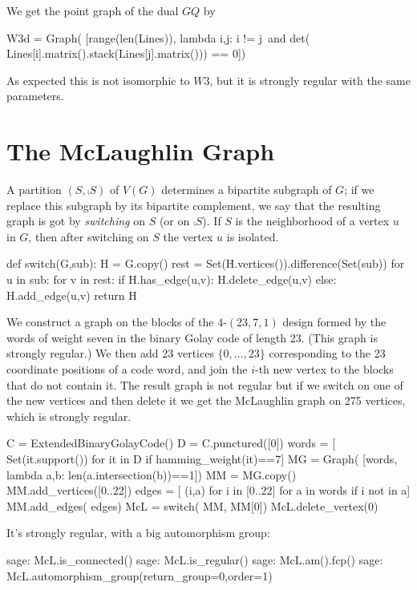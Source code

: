 We get the point graph of the dual $GQ$ by
\begin{sageblock}
W3d = Graph( [range(len(Lines)), lambda i,j: i != j\
    and det( Lines[i].matrix().stack(Lines[j].matrix())) == 0])
\end{sageblock}
As expected this is not isomorphic to $W3$, but it is strongly regular with
the same parameters.


\section{The McLaughlin Graph}

A partition $(S,\comp{S})$ of $V(G)$ determines a bipartite subgraph of $G$;
if we replace this subgraph by its bipartite complement, we say that the
resulting graph is got by \textsl{switching} on $S$ (or on $\comp{S}$).
If $S$ is the neighborhood of a vertex $u$ in $G$, then after switching
on $S$ the vertex $u$ is isolated.
                                                                               
\begin{sageblock}
def switch(G,sub):
    H = G.copy()
    rest = Set(H.vertices()).difference(Set(sub))
    for u in sub:
        for v in rest:
            if H.has_edge(u,v): H.delete_edge(u,v)
            else: H.add_edge(u,v)
    return H   
\end{sageblock}

We construct a graph on the blocks of the $4$-$(23,7,1)$ design
formed by the words of weight seven in the binary Golay code of length 23.
(This graph is strongly regular.)
We then add 23 vertices $\{0,\ldots,23\}$ corresponding to the 23 coordinate 
positions of a code word, and join the $i$-th new vertex to the blocks
that do not contain it. The result graph is not regular but if we switch on
one of the new vertices and then delete it we get the McLaughlin graph
on 275 vertices, which is strongly regular.

\begin{sageblock}
    C = ExtendedBinaryGolayCode()
    D = C.punctured([0])
    words = [ Set(it.support()) for it in D if hamming_weight(it)==7]
    MG = Graph( [words, lambda a,b: len(a.intersection(b))==1])
    MM = MG.copy()
    MM.add_vertices([0..22])
    edges = [ (i,a) for i in [0..22] for a in words if i not in a]
    MM.add_edges( edges)
    McL = switch( MM, MM[0])
    McL.delete_vertex(0)
\end{sageblock}

It's strongly regular, with a big automorphism group:
\begin{sageexample}
sage: McL.is_connected()
sage: McL.is_regular()
sage: McL.am().fcp()
sage: McL.automorphism_group(return_group=0,order=1)
\end{sageexample}

